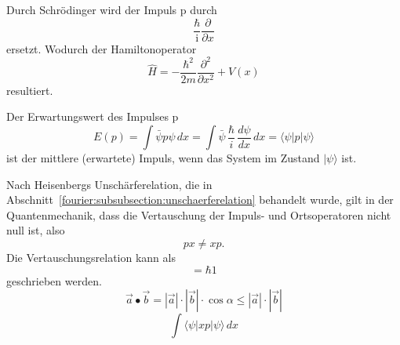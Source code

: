 Durch Schrödinger wird der Impuls p durch
\begin{equation}
	\frac{\hbar}{\mathrm{i}} \frac{\partial}{\partial x}
\end{equation}
ersetzt.
Wodurch der Hamiltonoperator
\begin{equation}
	\hat{H} = -\frac{\hbar^2}{2m}\frac{\partial^2}{\partial x^2} + V(x)
\end{equation}	
resultiert.

Der Erwartungswert des Impulses p
\begin{equation}
	E(p) = \int \bar{\psi}p\psi \, dx
	= \int \bar{\psi} \, \frac{\hbar}{i} \, \frac{d\psi}{dx} \, dx
	= \langle \psi | p | \psi \rangle
\end{equation}
ist der mittlere (erwartete) Impuls, wenn das System im Zustand $| \psi \rangle$ ist.

Nach Heisenbergs Unschärferelation, die in Abschnitt~\ref{fourier:subsubsection:unschaerferelation} behandelt wurde, gilt in der Quantenmechanik, dass die Vertauschung der Impuls- und Ortsoperatoren nicht null ist, also
\begin{equation}
	px \neq xp.
\end{equation}
Die Vertauschungsrelation kann als
\begin{equation}
	[x, p] = \hbar 1 %
\end{equation}
geschrieben werden.
\begin{equation}
	\vec{a}\bullet\vec{b} = |\vec{a}| \cdot |\vec{b}| \cdot \cos{\alpha} \leq |\vec{a}| \cdot |\vec{b}|
\end{equation}
\begin{equation}
	\int \langle \psi |xp|\psi \rangle\,dx	%
\end{equation}



